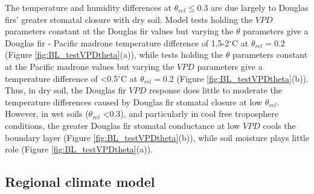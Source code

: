The temperature and humidity differences at $\theta_{rel} \le 0.3$ are due largely to Douglas firs' greater stomatal closure with dry soil.  Model tests holding the $VPD$ parameters constant at the Douglas fir values but varying the $\theta$ parameters give a Douglas fir - Pacific madrone temperature difference of 1.5-2$^\circ$C at $\theta_{rel} = 0.2$ (Figure \ref{fig:BL_testVPDtheta}(a)), while tests holding the $\theta$ parameters constant at the Pacific madrone values but varying the $VPD$ parameters give a temperature difference of \textless 0.5$^\circ$C at $\theta_{rel} = 0.2$ (Figure \ref{fig:BL_testVPDtheta}(b)).  Thus, in dry soil, the Douglas fir $VPD$ response does little to moderate the temperature differences caused by Douglas fir stomatal closure at low $\theta_{rel}$.  However, in wet soils ($\theta_{rel}$ \textless $0.3$), and particularly in cool free troposphere conditions, the greater Douglas fir stomatal conductance at low $VPD$ cools the boundary layer (Figure \ref{fig:BL_testVPDtheta}(b)), while soil moisture plays little role (Figure \ref{fig:BL_testVPDtheta}(a)).


\subsection{Regional climate model}

